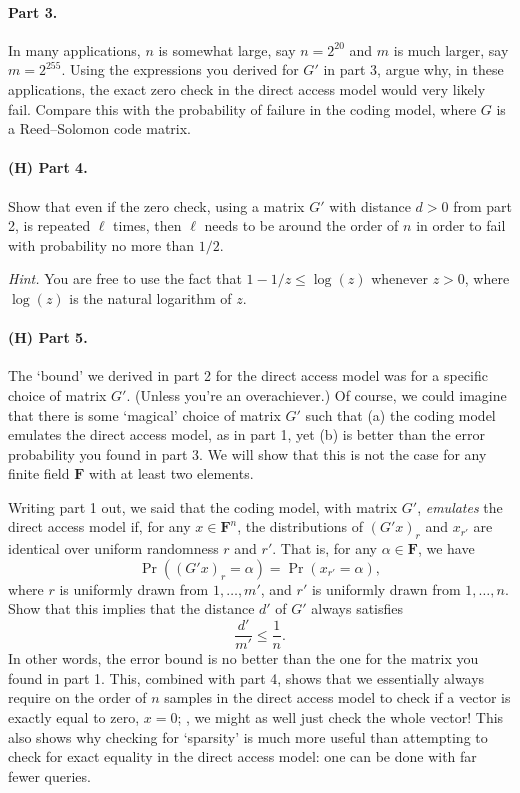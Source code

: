 \documentclass[12pt]{article}
\newcommand{\field}{\mathbf{F}}
\begin{document}
\paragraph{Part 3.} In many applications, $n$ is somewhat large, say $n=2^{20}$
and $m$ is much larger, say $m=2^{255}$. Using the expressions you derived for
$G'$ in part 3, argue why, in these applications, the exact zero check in the
direct access model would very likely fail. Compare this with the probability
of failure in the coding model, where $G$ is a Reed--Solomon code matrix. 

\paragraph{(H) Part 4.} Show that even if the zero check, using a matrix $G'$
with distance $d > 0$ from part 2, is repeated $\ell$ times, then $\ell$ needs
to be around the order of $n$ in order to fail with probability no more than
$1/2$.

\emph{Hint.} You are free to use the fact that $1-1/z \le \log(z)$ whenever $z
> 0$, where $\log(z)$ is the natural logarithm of $z$.

\paragraph{(H) Part 5.} The `bound' we derived in part 2 for the direct access
model was for a specific choice of matrix $G'$. (Unless you're an overachiever.)
Of course, we could imagine that there is some `magical' choice of matrix $G'$
such that (a) the coding model emulates the direct access model, as in part 1,
yet (b) is better than the error probability you found in part 3. We will
show that this is not the case for any finite field $\field$ with at least two
elements.

Writing part 1 out, we said that the coding model, with matrix $G'$,
\emph{emulates} the direct access model if, for any $x \in \field^n$, the
distributions of $(G'x)_r$ and $x_{r'}$ are identical over uniform randomness
$r$ and $r'$. That is, for any $\alpha \in \field$, we have
\[
    \Pr((G'x)_r = \alpha) = \Pr(x_{r'} = \alpha),
\]
where $r$ is uniformly drawn from $1, \dots, m'$, and $r'$ is uniformly drawn
from $1, \dots, n$. Show that this implies that the distance $d'$ of $G'$
always satisfies
\[
    \frac{d'}{m'} \le \frac{1}{n}.
\]
In other words, the error bound is no better than the one for the matrix you
found in part 1. This, combined with part 4, shows that we essentially always
require on the order of $n$ samples in the direct access model to check if a
vector is exactly equal to zero, $x = 0$; \ie, we might as well just check the
whole vector! This also shows why checking for `sparsity' is much more useful
than attempting to check for exact equality in the direct access model: one
can be done with far fewer queries.
\end{document}
